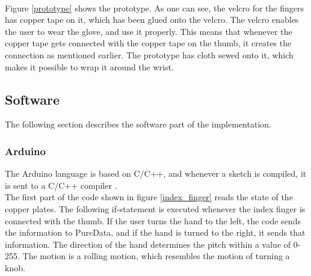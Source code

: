 \begin{minipage}{\linewidth}%
\label{pull_down}
\end{minipage}\\

Figure \ref{prototype} shows the prototype. As one can see, the velcro for the fingers has copper tape on it, which has been glued onto the velcro. The velcro enables the user to wear the glove, and use it properly.  
This means that whenever the copper tape gets connected with the copper tape on the thumb, it creates the connection as mentioned earlier. 
The prototype has cloth sewed onto it, which makes it possible to wrap it around the wrist. \\

\begin{minipage}{\linewidth}%
\label{prototype}
\end{minipage}

\subsection{Software}

The following section describes the software part of the implementation. 

\subsubsection{Arduino}
The Arduino language is based on C/C++, and whenever a sketch is compiled, it is sent to a C/C++ compiler \citep{Arduino_FAQ}.\\

The first part of the code shown in figure \ref{index_finger} reads the state of the copper plates. The following if-statement is executed whenever the index finger is connected with the thumb. 
If the user turns the hand to the left, the code sends the information to PureData, and if the hand is turned to the right, it sends that information. 
The direction of the hand determines the pitch within a value of 0-255. The motion is a rolling motion, which resembles the motion of turning a knob. \\


